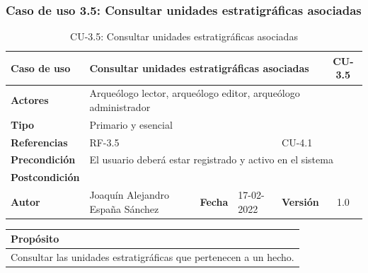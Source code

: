 \subsubsection{Caso de uso 3.5: Consultar unidades estratigráficas asociadas}

    \begin{table}[H]
    \begin{center}
        \begin{adjustbox}{width=\textwidth}
        \begin{tabular}{ | l | l | l | l | c | c | } 
            \hline
            \textbf{Caso de uso} & \multicolumn{4}{l|}{Consultar unidades estratigráficas asociadas} & \cellcolor{gray!50} \textbf{CU-3.5}\\
            \hline
            \textbf{Actores} & \multicolumn{5}{p{0.9\linewidth}|}{Arqueólogo lector, arqueólogo editor, arqueólogo administrador} \\
            \hline
            \textbf{Tipo} & \multicolumn{5}{l|}{Primario y esencial} \\
            \hline
            \textbf{Referencias} & \multicolumn{3}{l|}{RF-3.5} & \multicolumn{2}{l|}{CU-4.1}\\
            \hline
            \textbf{Precondición} & \multicolumn{5}{l|}{El usuario deberá estar registrado y activo en el sistema} \\
            \hline
            \textbf{Postcondición} & \multicolumn{5}{l|}{} \\
            \hline
            \textbf{Autor} & \multicolumn{1}{p{0.25\linewidth}|}{Joaquín Alejandro España Sánchez} & \textbf{Fecha} & 
            17-02-2022     & \textbf{Versión}                                                      & 1.0\\
            \hline
        \end{tabular}
        \end{adjustbox}
        \caption{CU-3.5: Consultar unidades estratigráficas asociadas}
        \label{tab:consult-ue-fact}
    \end{center}
    \end{table}

    \begin{table}[H]
        \centering
        \begin{tabularx}{\textwidth}{@{} |L |@{}} \hline
            \textbf{Propósito} \\
            \hline
            Consultar las unidades estratigráficas que pertenecen a un hecho. \\
            \hline
        \end{tabularx}
    \end{table}

